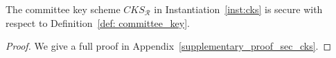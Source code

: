 \vspace{-0.07in}
\begin{theorem} 
The committee key scheme $\mathit{CKS}_{\mathcal{R}}$ in Instantiation~\ref{inst:cks} is secure with respect to Definition~\ref{def: committee_key}.
\end{theorem}
\vspace{-0.08in}
\begin{proof} We give a full proof in Appendix~\ref{supplementary_proof_sec_cks}. 
\end{proof}

